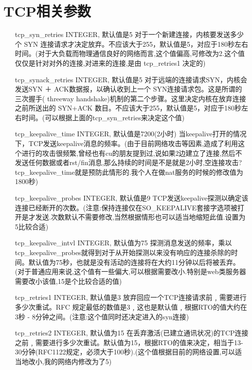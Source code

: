 \section{TCP相关参数}
\begin{enumerate}
\item[tcp\_syn\_retries]  INTEGER,
默认值是5
对于一个新建连接，内核要发送多少个 SYN 连接请求才决定放弃。不应该大于255，默认值是5，对应于180秒左右时间。(对于大负载而物理通信良好的网络而言,这个值偏高,可修改为2.这个值仅仅是针对对外的连接,对进来的连接,是由
tcp\_retries1 决定的)

\item[tcp\_synack\_retries] INTEGER,
默认值是5
对于远端的连接请求SYN，内核会发送SYN ＋ ACK数据报，以确认收到上一个 SYN连接请求包。这是所谓的三次握手( threeway handshake)机制的第二个步骤。这里决定内核在放弃连接之前所送出的 SYN+ACK 数目。不应该大于255，默认值是5，对应于180秒左右时间。(可以根据上面的tcp\_syn\_retries来决定这个值)

\item[tcp\_keepalive\_time] INTEGER,
默认值是7200(2小时)
当keepalive打开的情况下，TCP发送keepalive消息的频率。(由于目前网络攻击等因素,造成了利用这个进行的攻击很频繁,曾经也有cu的朋友提到过,说如果2边建立了连接,然后不发送任何数据或者rst/fin消息,那么持续的时间是不是就是2小时,空连接攻击?tcp\_keepalive\_time就是预防此情形的.我个人在做nat服务的时候的修改值为1800秒)

\item[tcp\_keepalive\_probes] INTEGER,
默认值是9
TCP发送keepalive探测以确定该连接已经断开的次数。(注意:保持连接仅在SO\_KEEPALIVE套接字选项被打开是才发送.次数默认不需要修改,当然根据情形也可以适当地缩短此值.设置为5比较合适)

\item[tcp\_keepalive\_intvl] INTEGER,
默认值为75
探测消息发送的频率，乘以tcp\_keepalive\_probes就得到对于从开始探测以来没有响应的连接杀除的时间。默认值为75秒，也就是没有活动的连接将在大约11分钟以后将被丢弃。(对于普通应用来说,这个值有一些偏大,可以根据需要改小.特别是web类服务器需要改小该值,15是个比较合适的值)

\item[tcp\_retries1] INTEGER,
默认值是3
放弃回应一个TCP连接请求前﹐需要进行多少次重试。RFC 规定最低的数值是3﹐这也是默认值﹐根据RTO的值大约在3秒 - 8分钟之间。(注意:这个值同时还决定进入的syn连接)

\item[tcp\_retries2] INTEGER,
默认值为15
在丢弃激活(已建立通讯状况)的TCP连接之前﹐需要进行多少次重试。默认值为15，根据RTO的值来决定，相当于13-30分钟(RFC1122规定，必须大于100秒).(这个值根据目前的网络设置,可以适当地改小,我的网络内修改为了5)


\end{enumerate}

